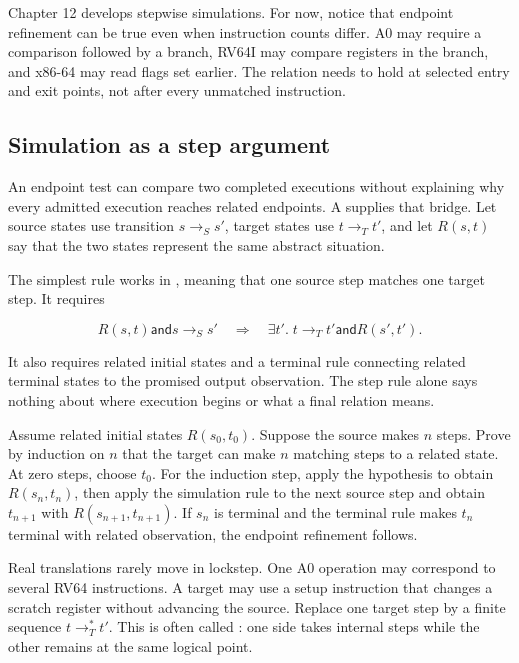 Chapter 12 develops stepwise simulations. For now, notice that endpoint
refinement can be true even when instruction counts differ. A0 may require a
comparison followed by a branch, RV64I may compare registers in the branch,
and x86-64 may read flags set earlier. The relation needs to hold at selected
entry and exit points, not after every unmatched instruction.

\subsection{Simulation as a step argument}

An endpoint test can compare two completed executions without explaining why
every admitted execution reaches related endpoints. A  supplies that bridge. Let source states use transition
\(s\rightarrow_S s'\), target states use \(t\rightarrow_T t'\), and let
\(R(s,t)\) say that the two states represent the same abstract situation.

The simplest rule works in , meaning that one source step
matches one target step. It requires

\[
  R(s,t)\mathbin{\mathsf{and}}s\rightarrow_S s'
  \quad\Longrightarrow\quad
  \exists t'.\;t\rightarrow_T t'\mathbin{\mathsf{and}}R(s',t').
\]

It also requires related initial states and a terminal rule connecting related
terminal states to the promised output observation. The step rule alone says
nothing about where execution begins or what a final relation means.

\begin{proofkit}[title={Finite lockstep simulation}]
Assume related initial states \(R(s_0,t_0)\). Suppose the source makes \(n\)
steps. Prove by induction on \(n\) that the target can make \(n\) matching
steps to a related state. At zero steps, choose \(t_0\). For the induction
step, apply the hypothesis to obtain \(R(s_n,t_n)\), then apply the simulation
rule to the next source step and obtain \(t_{n+1}\) with
\(R(s_{n+1},t_{n+1})\). If \(s_n\) is terminal and the terminal rule makes
\(t_n\) terminal with related observation, the endpoint refinement follows.
\end{proofkit}

Real translations rarely move in lockstep. One A0 operation may correspond to
several RV64 instructions. A target may use a setup instruction that changes a
scratch register without advancing the source. Replace one target step by a
finite sequence \(t\rightarrow_T^{*}t'\). This is often called
: one side takes internal steps while the other remains at
the same logical point.

